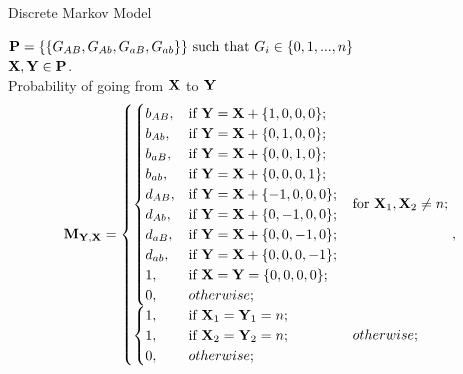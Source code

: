 \documentclass{beamer}
\begin{document}
\begin{frame}{Discrete Markov Model}
\footnotesize

$\bold{P} = \{\{G_{AB},G_{Ab},G_{aB},G_{ab}\}\} \text{ such that } G_i\in\{0,1,...,n\}$\\ 
$\bold{X},\bold{Y} \in \bold{P}$. \\

Probability of going from $\bold{X}$ to $\bold{Y}$
\begin{equation*}
\bold{M}_{\bold{Y},\bold{X}}=
\begin{aligned}
\begin{cases}
\begin{cases}
    b_{AB}, & \text{if } \bold{Y} = \bold{X} + \{1,0,0,0\}; \\
    b_{Ab}, & \text{if } \bold{Y} = \bold{X} + \{0,1,0,0\};  \\
    b_{aB}, & \text{if } \bold{Y} = \bold{X} + \{0,0,1,0\}; \\
    b_{ab}, & \text{if } \bold{Y} = \bold{X} + \{0,0,0,1\}; \\
    d_{AB}, & \text{if } \bold{Y} = \bold{X} + \{-1,0,0,0\}; \\
    d_{Ab}, & \text{if } \bold{Y} = \bold{X} + \{0,-1,0,0\};  \\
    d_{aB}, & \text{if } \bold{Y} = \bold{X} + \{0,0,-1,0\}; \\
    d_{ab}, & \text{if } \bold{Y} = \bold{X} + \{0,0,0,-1\}; \\
    1, & \text{if}\ \bold{X} = \bold{Y} = \{0,0,0,0\}; \\
    0, & otherwise;
\end{cases}  & \text{for}\ \bold{X}_1, \bold{X}_2 \neq n; \\
\begin{cases} 
    1, & \text{if}\ \bold{X}_1 = \bold{Y}_1 = n; \\
    1, & \text{if}\ \bold{X}_2 = \bold{Y}_2 = n;  \\
    \mathrlap{0,}\hphantom{d_{AB},} & otherwise;
\end{cases} & otherwise;
\end{cases},
\end{aligned}
\end{equation*}
\normalsize

\end{frame}
\end{document}
